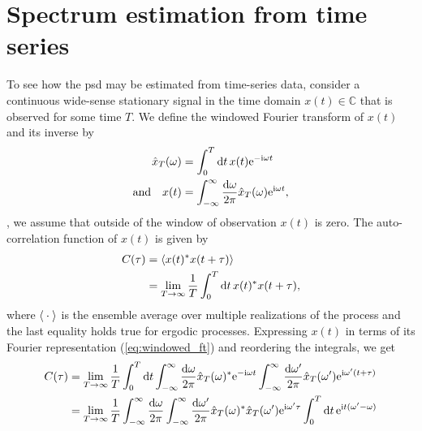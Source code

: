 \section{Spectrum estimation from time series}\label{sec:speck:theory:time_series_estimation}
To see how the \gls{psd} may be estimated from time-series data, consider a continuous wide-sense stationary
signal in the time domain $x(t)\in\mathbb{C}$ that is observed for some time $T$.
We define the windowed Fourier transform of $x(t)$ and its inverse by
\begin{align}
    \hat{x}_T(\omega) &= \int_{0}^{T}\dd{t} x(t)\e^{-\i\omega t} \label{eq:windowed_ft}\\
       \qq*{and} x(t) &= \intinf\ddf{\omega}\hat{x}_T(\omega)\e^{\i\omega t}, \label{eq:windowed_ft:inverse}
\end{align}
\ie, we assume that outside of the window of observation $x(t)$ is zero.
The auto-correlation function of $x(t)$ is given by
\begin{align}
    C(\tau) &= \expval{x(t)^\ast x(t + \tau)} \label{eq:autocorrelation}\\
            &= \lim_{T\to\infty} \frac{1}{T}\int_0^T\dd{t} x(t)^{\ast} x(t + \tau),
\end{align}
where $\expval{\:\cdot\:}$ is the ensemble average over multiple realizations of the process and the last equality holds true for ergodic processes.
Expressing $x(t)$ in terms of its Fourier representation (\cref{eq:windowed_ft}) and reordering the integrals, we get
\begin{align}
    C(\tau) &= \lim_{T\to\infty}\frac{1}{T}\int_0^T\dd{t}
                \int_{-\infty}^{\infty}\frac{\dd{\omega}}{2\pi}\hat{x}_T(\omega)^{\ast}\mathrm{e}^{-\mathrm{i}\omega t}
                \int_{-\infty}^{\infty}\frac{\dd{\omega^\prime}}{2\pi}\hat{x}_T(\omega^\prime)\mathrm{e}^{\mathrm{i}\omega^\prime (t + \tau)}  \\
            &= \lim_{T\to\infty}\frac{1}{T}\int_{-\infty}^{\infty}\frac{\dd{\omega}}{2\pi}\int_{-\infty}^{\infty}\frac{\dd{\omega^\prime}}{2\pi}
                \hat{x}_T(\omega)^{\ast}\hat{x}_T(\omega^\prime)\mathrm{e}^{\mathrm{i}\omega^\prime\tau}
                \int_0^T\dd{t}\mathrm{e}^{\mathrm{i} t (\omega^\prime - \omega)} \label{eq:autocorrelation:fourier}
\end{align}
